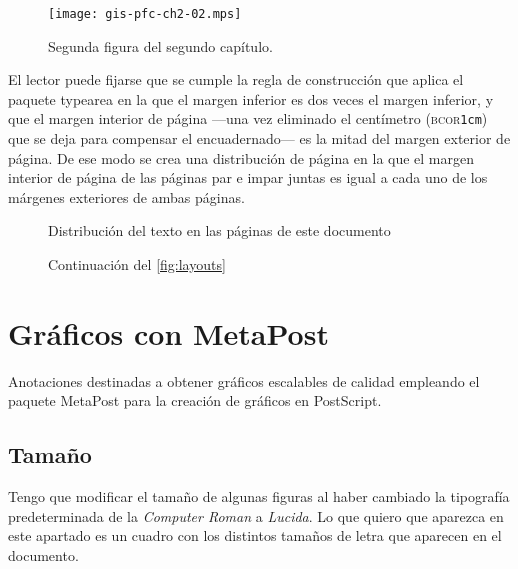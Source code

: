 \begin{figure}
	\begin{center}
		\texttt{[image: gis-pfc-ch2-02.mps]}
	\end{center}
	\caption[Segunda figura del segundo capítulo]{Segunda figura del segundo capítulo.}
	\label{fig:ch102}
\end{figure}

El lector puede fijarse que se cumple la regla de construcción que aplica el paquete \textsf{typearea} en la que el margen inferior es dos veces el margen inferior, y que el margen interior de página ---una vez eliminado el centímetro (\textsc{bcor}\texttt{1cm}) que se deja para compensar el encuadernado--- es la mitad del margen exterior de página. De ese modo se crea una distribución de página en la que el margen interior de página de las páginas par e impar juntas es igual a cada uno de los márgenes exteriores de ambas páginas.

\begin{figure}
	\pagediagram
	\caption{Distribución del texto en las páginas de este documento}
	\label{fig:layouts}
\end{figure}

\begin{figure}\ContinuedFloat
	\currentpage
	\pagedesign
	\caption[]{Continuación del \vref{fig:layouts}}
\end{figure}


\section{Gráficos con MetaPost}

Anotaciones destinadas a obtener gráficos escalables de calidad empleando el paquete MetaPost para la creación de gráficos en PostScript.


\subsection{Tamaño}

Tengo que modificar el tamaño de algunas figuras al haber cambiado la tipografía predeterminada de la \emph{Computer Roman} a \emph{Lucida}. Lo que quiero que aparezca en este apartado es un cuadro con los distintos tamaños de letra que aparecen en el documento.
